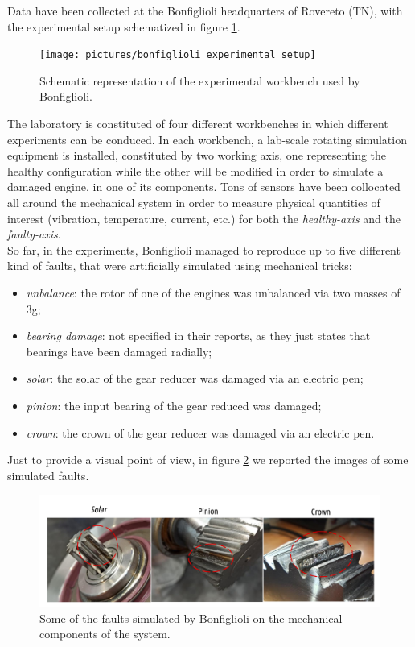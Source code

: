 \documentclass[../main.tex]{subfiles}
\begin{document}
Data have been collected at the Bonfiglioli headquarters of Rovereto (TN), with the experimental setup schematized in figure \ref{fig:bonfiglioli_experimental_setup}.
\begin{figure}[ht]
	\centering
	\texttt{[image: pictures/bonfiglioli\_experimental\_setup]}
	\caption{Schematic representation of the experimental workbench used by Bonfiglioli.}
	\label{fig:bonfiglioli_experimental_setup}	
\end{figure}
The laboratory is constituted of four different workbenches in which different experiments can be conduced. In each workbench, a lab-scale rotating simulation equipment is installed, constituted by two working axis, one representing the healthy configuration while the other will be modified in order to simulate a damaged engine, in one of its components. Tons of sensors have been collocated all around the mechanical system in order to measure physical quantities of interest (vibration, temperature, current, etc.) for both the \textit{healthy-axis} and the \textit{faulty-axis}.\\
So far, in the experiments, Bonfiglioli managed to reproduce up to five different kind of faults, that were artificially simulated using mechanical tricks:
\begin{itemize}
	\item \textit{unbalance}: the rotor of one of the engines was unbalanced via two masses of 3g;
	\item \textit{bearing damage}: not specified in their reports, as they just states that bearings have been damaged radially; 
	\item \textit{solar}: the solar of the gear reducer was damaged via an electric pen; 
	\item \textit{pinion}: the input bearing of the gear reduced was damaged; 
	\item \textit{crown}: the crown of the gear reducer was damaged via an electric pen.
\end{itemize}
Just to provide a visual point of view, in figure \ref{fig:example_bonfiglioli_faults} we reported the images of some simulated faults.
\begin{figure}[ht]
	\centering
	\includegraphics[width=\textwidth]{pictures/example_bonfiglioli_faults}
	\caption{Some of the faults simulated by Bonfiglioli on the mechanical components of the system.}
	\label{fig:example_bonfiglioli_faults}
\end{figure}
\end{document}
